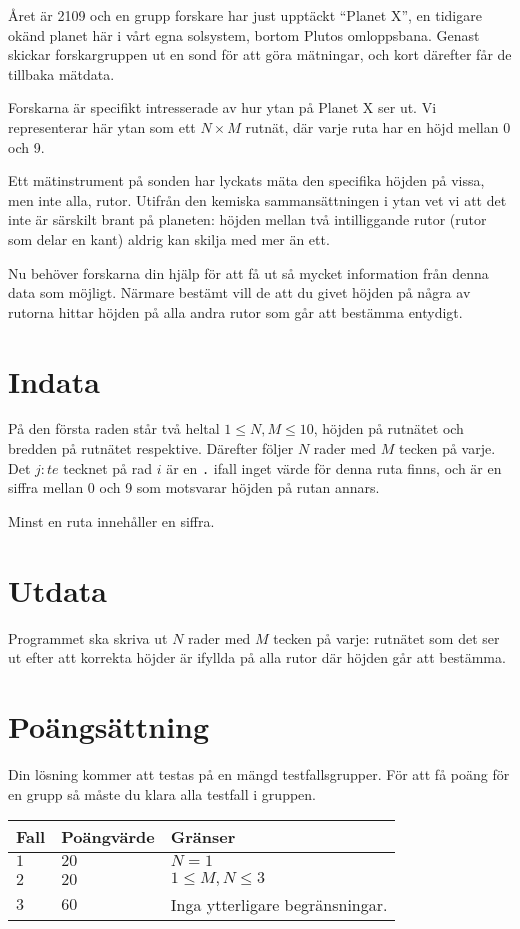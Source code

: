 Året är 2109 och en grupp forskare har just upptäckt ``Planet X'', 
en tidigare okänd planet här i vårt egna solsystem,
bortom Plutos omloppsbana. Genast skickar forskargruppen ut
en sond för att göra mätningar, och kort därefter får de tillbaka mätdata.

Forskarna är specifikt intresserade av hur ytan på Planet X ser ut.
Vi representerar här ytan som ett $N \times M$ rutnät, där varje ruta
har en höjd mellan 0 och 9.

Ett mätinstrument på sonden har lyckats mäta den specifika höjden
på vissa, men inte alla, rutor. Utifrån den kemiska sammansättningen i ytan vet vi att det inte 
är särskilt brant på planeten: höjden mellan två
intilliggande rutor (rutor som delar en kant) aldrig kan skilja 
med mer än ett. 

Nu behöver forskarna din hjälp för att få ut så mycket information
från denna data som möjligt. Närmare bestämt vill de att du givet höjden
på några av rutorna hittar höjden på alla andra rutor som går att bestämma entydigt.

\section*{Indata}
På den första raden står två heltal $1 \le N,M \le 10$, 
höjden på rutnätet och bredden på rutnätet respektive.
Därefter följer $N$ rader med $M$ tecken på varje.
Det $j:te$ tecknet på rad $i$ är en \texttt{.} ifall
inget värde för denna ruta finns, och är en siffra mellan
0 och 9 som motsvarar höjden på rutan annars.

Minst en ruta innehåller en siffra.

\section*{Utdata}
Programmet ska skriva ut $N$ rader med $M$ tecken på varje:
rutnätet som det ser ut efter att
korrekta höjder är ifyllda på alla rutor där höjden går att bestämma.

\section*{Poängsättning}
Din lösning kommer att testas på en mängd testfallsgrupper.
För att få poäng för en grupp så måste du klara alla testfall i gruppen.

\noindent
\begin{tabular}{| l | l | l |}
  \hline
  Fall & Poängvärde & Gränser \\ \hline
  $1$    & $20$        &  $N = 1$\\ \hline 
  $2$    & $20$        &  $1 \leq M, N \leq 3$\\ \hline 
  $3$    & $60$        &  Inga ytterligare begränsningar. \\ \hline
\end{tabular}

